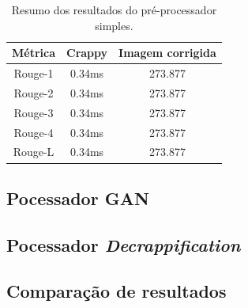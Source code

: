 \begin{table}[H]
  \centering
  \caption{Resumo dos resultados do pré-processador simples.}
  \begin{tabular}{|c|c|c|}
    \hline
      \textbf{Métrica}  &
      \textbf{Crappy}  &
      \textbf{Imagem corrigida} \\
    \hline
      Rouge-1  &
      0.34ms &
      273.877 \\
    \hline
      Rouge-2  &
      0.34ms &
      273.877 \\
    \hline
      Rouge-3  &
      0.34ms &
      273.877 \\
    \hline
      Rouge-4  &
      0.34ms &
      273.877 \\
    \hline
      Rouge-L &
      0.34ms &
      273.877 \\
    \hline
  \end{tabular}
  \label{tab:pre-processor-result}
\end{table}

\subsection{Pocessador GAN} \label{ssec:processor-gan}
\subsection{Pocessador \textit{Decrappification}}
\subsection{Comparação de resultados}